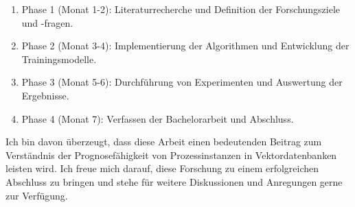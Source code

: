 \documentclass[11pt]{article}
\begin{document}
    \begin{enumerate}
        \item Phase 1 (Monat 1-2): Literaturrecherche und Definition der Forschungsziele und -fragen.
        \item Phase 2 (Monat 3-4): Implementierung der Algorithmen und Entwicklung der Trainingsmodelle.
        \item Phase 3 (Monat 5-6): Durchführung von Experimenten und Auswertung der Ergebnisse.
        \item Phase 4 (Monat 7): Verfassen der Bachelorarbeit und Abschluss.
    \end{enumerate}

    Ich bin davon überzeugt, dass diese Arbeit einen bedeutenden Beitrag zum Verständnis der Prognosefähigkeit von Prozessinstanzen in Vektordatenbanken leisten wird. Ich freue mich darauf, diese Forschung zu einem erfolgreichen Abschluss zu bringen und stehe für weitere Diskussionen und Anregungen gerne zur Verfügung.
\end{document}
